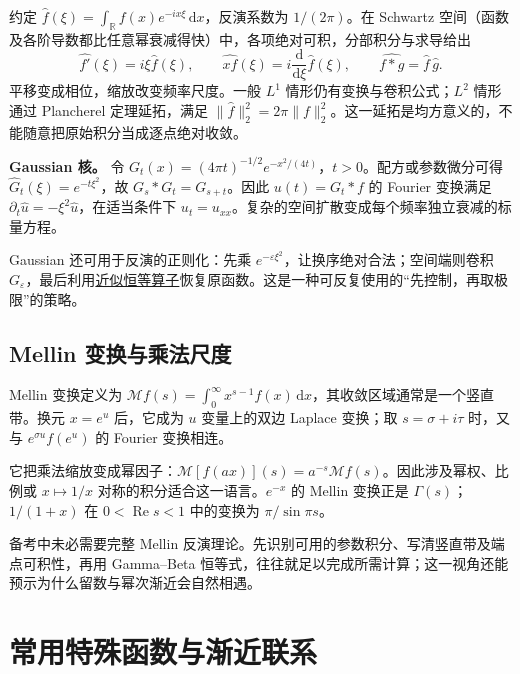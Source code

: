 \documentclass[UTF8,12pt,a4paper,fontset=fandol]{ctexart}
\begin{document}
\label{app:transform-fourier}

约定 $\widehat f(\xi)=\int_{\mathbb R}f(x)e^{-ix\xi}\,\mathrm dx$，反演系数为 $1/(2\pi)$。在 Schwartz 空间（函数及各阶导数都比任意幂衰减得快）中，各项绝对可积，分部积分与求导给出
\[
\widehat{f'}(\xi)=i\xi\widehat f(\xi),\qquad
\widehat{xf}(\xi)=i\frac{\mathrm d}{\mathrm d\xi}\widehat f(\xi),\qquad
\widehat{f*g}=\widehat f\,\widehat g.
\]
平移变成相位，缩放改变频率尺度。一般 $L^1$ 情形仍有变换与卷积公式；$L^2$ 情形通过 Plancherel 定理延拓，满足 $\|\widehat f\|_2^2=2\pi\|f\|_2^2$。这一延拓是均方意义的，不能随意把原始积分当成逐点绝对收敛。

\textbf{Gaussian 核。} 令 $G_t(x)=(4\pi t)^{-1/2}e^{-x^2/(4t)}$，$t>0$。配方或参数微分可得 $\widehat G_t(\xi)=e^{-t\xi^2}$，故 $G_s*G_t=G_{s+t}$。因此 $u(t)=G_t*f$ 的 Fourier 变换满足 $\partial_t\widehat u=-\xi^2\widehat u$，在适当条件下 $u_t=u_{xx}$。复杂的空间扩散变成每个频率独立衰减的标量方程。

Gaussian 还可用于反演的正则化：先乘 $e^{-\varepsilon\xi^2}$，让换序绝对合法；空间端则卷积 $G_\varepsilon$，最后利用\hyperref[app:integration-local]{近似恒等算子}恢复原函数。这是一种可反复使用的“先控制，再取极限”的策略。

\subsection{Mellin 变换与乘法尺度}

\label{app:transform-mellin}

Mellin 变换定义为 $\mathcal Mf(s)=\int_0^\infty x^{s-1}f(x)\,\mathrm dx$，其收敛区域通常是一个竖直带。换元 $x=e^u$ 后，它成为 $u$ 变量上的双边 Laplace 变换；取 $s=\sigma+i\tau$ 时，又与 $e^{\sigma u}f(e^u)$ 的 Fourier 变换相连。

它把乘法缩放变成幂因子：$\mathcal M[f(ax)](s)=a^{-s}\mathcal Mf(s)$。因此涉及幂权、比例或 $x\mapsto1/x$ 对称的积分适合这一语言。$e^{-x}$ 的 Mellin 变换正是 $\Gamma(s)$；$1/(1+x)$ 在 $0<\operatorname{Re}s<1$ 中的变换为 $\pi/\sin\pi s$。

备考中未必需要完整 Mellin 反演理论。先识别可用的参数积分、写清竖直带及端点可积性，再用 Gamma--Beta 恒等式，往往就足以完成所需计算；这一视角还能预示为什么留数与幂次渐近会自然相遇。



\section{常用特殊函数与渐近联系}
\end{document}

